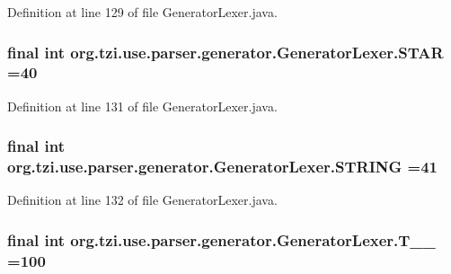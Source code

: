 Definition at line 129 of file Generator\-Lexer.\-java.

\hypertarget{classorg_1_1tzi_1_1use_1_1parser_1_1generator_1_1_generator_lexer_ad71184970b13c457209cb7b1af820b21}{
\subsubsection[{S\-T\-A\-R}]{\setlength{\rightskip}{0pt plus 5cm}final int org.\-tzi.\-use.\-parser.\-generator.\-Generator\-Lexer.\-S\-T\-A\-R =40\hspace{0.3cm}{\ttfamily [static]}}}\label{classorg_1_1tzi_1_1use_1_1parser_1_1generator_1_1_generator_lexer_ad71184970b13c457209cb7b1af820b21}


Definition at line 131 of file Generator\-Lexer.\-java.

\hypertarget{classorg_1_1tzi_1_1use_1_1parser_1_1generator_1_1_generator_lexer_af80462dd4378a607a7a63d5c02c2f501}{
\subsubsection[{S\-T\-R\-I\-N\-G}]{\setlength{\rightskip}{0pt plus 5cm}final int org.\-tzi.\-use.\-parser.\-generator.\-Generator\-Lexer.\-S\-T\-R\-I\-N\-G =41\hspace{0.3cm}{\ttfamily [static]}}}\label{classorg_1_1tzi_1_1use_1_1parser_1_1generator_1_1_generator_lexer_af80462dd4378a607a7a63d5c02c2f501}


Definition at line 132 of file Generator\-Lexer.\-java.

\hypertarget{classorg_1_1tzi_1_1use_1_1parser_1_1generator_1_1_generator_lexer_a60da7ab030aeec47ef22a35b393fccca}{
\subsubsection[{T\-\_\-\-\_\-100}]{\setlength{\rightskip}{0pt plus 5cm}final int org.\-tzi.\-use.\-parser.\-generator.\-Generator\-Lexer.\-T\-\_\-\-\_ =100\hspace{0.3cm}{\ttfamily [static]}}}\label{classorg_1_1tzi_1_1use_1_1parser_1_1generator_1_1_generator_lexer_a60da7ab030aeec47ef22a35b393fccca}


